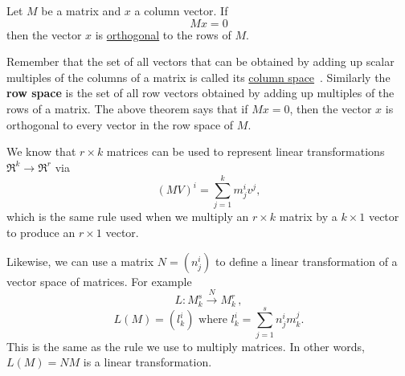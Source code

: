 \begin{theorem}
Let $M$ be a matrix and $x$ a column vector. If 
\[
Mx=0
\]
then the vector $x$ is \hyperlink{orthog}{orthogonal} to the rows of $M$.
\end{theorem}

\begin{remark}
Remember that the set of all vectors that can be obtained by adding up scalar multiples of the columns of a matrix is called its \hyperlink{column space}{column space}~. Similarly the {\bfseries row space} is the set of all row vectors obtained by adding up multiples of the rows of a matrix. The above theorem says that if $Mx=0$, then the vector $x$ is orthogonal to every vector in the row space of $M$.
\end{remark}



We know that $r\times k$ matrices can be used to represent linear transformations 
$ \Re^k \rightarrow \Re^r $
via \[(MV)^i = \sum_{j=1}^{k} m_j^iv^j , \] which is the same rule used when we multiply an $r\times k$ matrix by a $k\times 1$ vector to produce an $r\times1$ vector.

Likewise, we can use a matrix $N=(n^i_j)$ to define a linear transformation of a vector space of matrices. For example
\[
L \colon M^s_k \stackrel{N}{\longrightarrow} M^r_k\, ,
\]
\[
L(M)=(l^i_k) \mbox{ where } l^i_k= \sum_{j=1}^{s} n_j^im^j_k.
\]
This is the same as the rule we use to multiply matrices. \hypertarget{leftmult}{In other words,} \(L(M)=NM\) is a linear transformation.

